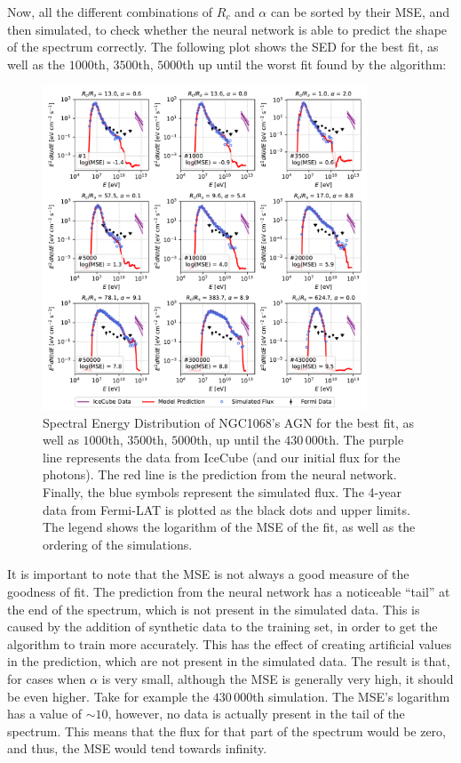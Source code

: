 Now, all the different combinations of $R_c$ and $\alpha$ can be sorted by their MSE, and then simulated, to check whether the neural network is able to predict the shape of the spectrum correctly. The following plot shows the SED for the best fit, as well as the $1000$th, $3500$th, $5000$th up until the worst fit found by the algorithm:

\begin{figure}[H]
    \includegraphics[width=0.86\textwidth]{Figures/selected_simulations_plot.pdf}
    \centering
    \caption{Spectral Energy Distribution of NGC1068's AGN for the best fit, as well as $1000$th, $3500$th, $5000$th, up until the $430\,000$th. The purple line represents the data from IceCube (and our initial flux for the photons). The red line is the prediction from the neural network. Finally, the blue symbols represent the simulated flux. The 4-year data from Fermi-LAT is plotted as the black dots and upper limits. The legend shows the logarithm of the MSE of the fit, as well as the ordering of the simulations.}
    \label{fig:selected_simulations_plot}
\end{figure}

It is important to note that the MSE is not always a good measure of the goodness of fit. The prediction from the neural network has a noticeable ``tail'' at the end of the spectrum, which is not present in the simulated data. This is caused by the addition of synthetic data to the training set, in order to get the algorithm to train more accurately. This has the effect of creating artificial values in the prediction, which are not present in the simulated data. The result is that, for cases when $\alpha$ is very small, although the MSE is generally very high, it should be even higher. Take for example the $430\,000$th simulation. The MSE's logarithm has a value of $\sim 10$, however, no data is actually present in the tail of the spectrum. This means that the flux for that part of the spectrum would be zero, and thus, the MSE would tend towards infinity.

